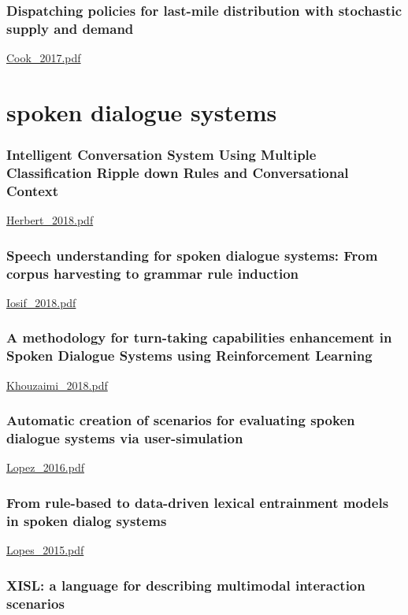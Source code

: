 \subsection{Dispatching policies for last-mile distribution with stochastic supply and demand}

\url{Cook_2017.pdf}\cite{Cook_2017}


\chapter{spoken dialogue systems}

\subsection{Intelligent Conversation System Using Multiple Classification Ripple down Rules and Conversational Context}

\url{Herbert_2018.pdf}\cite{Herbert_2018}

\subsection{Speech understanding for spoken dialogue systems: From corpus harvesting to grammar rule induction}

\url{Iosif_2018.pdf}\cite{Iosif_2018}

\subsection{A methodology for turn-taking capabilities enhancement in Spoken Dialogue Systems using Reinforcement Learning}

\url{Khouzaimi_2018.pdf}\cite{Khouzaimi_2018} 

\subsection{Automatic creation of scenarios for evaluating spoken dialogue systems via user-simulation}

\url{Lopez_2016.pdf}\cite{Lopez_2016}

\subsection{From rule-based to data-driven lexical entrainment models in spoken dialog systems}

\url{Lopes_2015.pdf}\cite{Lopes_2015}

\subsection{XISL: a language for describing multimodal interaction scenarios}

